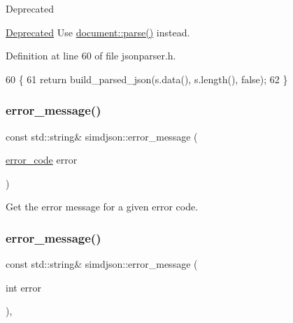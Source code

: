 \begin{DoxyRefDesc}{Deprecated}
\item[\hyperlink{deprecated__deprecated000019}{Deprecated}]Use {\ttfamily \hyperlink{classsimdjson_1_1document_a6f11cda7c4a06fffdc00fdc97d98ae2b}{document\+::parse()}} instead.\end{DoxyRefDesc}


Definition at line 60 of file jsonparser.\+h.


\begin{DoxyCode}
60                                                                                      \{
61   \textcolor{keywordflow}{return} build\_parsed\_json(s.data(), s.length(), \textcolor{keyword}{false});
62 \}
\end{DoxyCode}
\mbox{\label{namespacesimdjson_a4872e460818b01f93d883d184cd0009e}} 
\subsubsection{\texorpdfstring{error\+\_\+message()}{error\_message()}\hspace{0.1cm}{\footnotesize\ttfamily [1/2]}}
{\footnotesize\ttfamily const std\+::string\& simdjson\+::error\+\_\+message (\begin{DoxyParamCaption}\item[{\hyperlink{namespacesimdjson_a7b735a3a50ba79e3f7f14df5f77d8da9}{error\+\_\+code}}]{error }\end{DoxyParamCaption})\hspace{0.3cm}{\ttfamily [noexcept]}}



Get the error message for a given error code. 

\mbox{\label{namespacesimdjson_a764fbe7ff17a26fd55bf10dcb5b925c8}} 
\subsubsection{\texorpdfstring{error\+\_\+message()}{error\_message()}\hspace{0.1cm}{\footnotesize\ttfamily [2/2]}}
{\footnotesize\ttfamily const std\+::string\& simdjson\+::error\+\_\+message (\begin{DoxyParamCaption}\item[{int}]{error }\end{DoxyParamCaption})\hspace{0.3cm}{\ttfamily [inline]}, {\ttfamily [noexcept]}}


